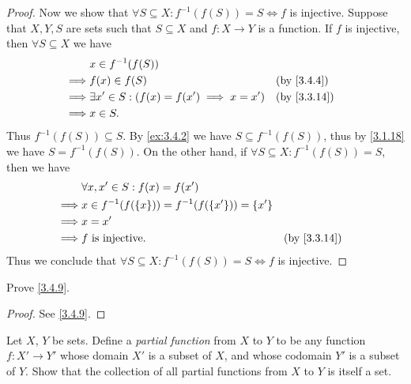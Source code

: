\begin{proof}
  Now we show that \(\forall S \subseteq X : f^{-1}(f(S)) = S \iff f\) is injective.
  Suppose that \(X, Y, S\) are sets such that \(S \subseteq X\) and \(f : X \to Y\) is a function.
  If \(f\) is injective, then \(\forall S \subseteq X\) we have
  \begin{align*}
             & x \in f^{-1}(f(S))                                                 \\
    \implies & f(x) \in f(S)                                     &  & \by{3.4.4}  \\
    \implies & \exists x' \in S : (f(x) = f(x') \implies x = x') &  & \by{3.3.14} \\
    \implies & x \in S.
  \end{align*}
  Thus \(f^{-1}(f(S)) \subseteq S\).
  By \cref{ex:3.4.2} we have \(S \subseteq f^{-1}(f(S))\), thus by \cref{3.1.18} we have \(S = f^{-1}(f(S))\).
  On the other hand, if \(\forall S \subseteq X : f^{-1}(f(S)) = S\), then we have
  \begin{align*}
             & \forall x, x' \in S : f(x) = f(x')                                         \\
    \implies & x \in f^{-1}(f(\set{x})) = f^{-1}(f(\set{x'})) = \set{x'}                  \\
    \implies & x = x'                                                                     \\
    \implies & f \text{ is injective}.                                   &  & \by{3.3.14}
  \end{align*}
  Thus we conclude that \(\forall S \subseteq X : f^{-1}(f(S)) = S \iff f\) is injective.
\end{proof}

\begin{ex}\label{ex:3.4.6}
  Prove \cref{3.4.9}.
\end{ex}

\begin{proof}
  See \cref{3.4.9}.
\end{proof}

\begin{ex}\label{ex:3.4.7}
  Let \(X\), \(Y\) be sets.
  Define a \emph{partial function} from \(X\) to \(Y\) to be any function \(f : X' \to Y'\) whose domain \(X'\) is a subset of \(X\), and whose codomain \(Y'\) is a subset of \(Y\).
  Show that the collection of all partial functions from \(X\) to \(Y\) is itself a set.
\end{ex}

